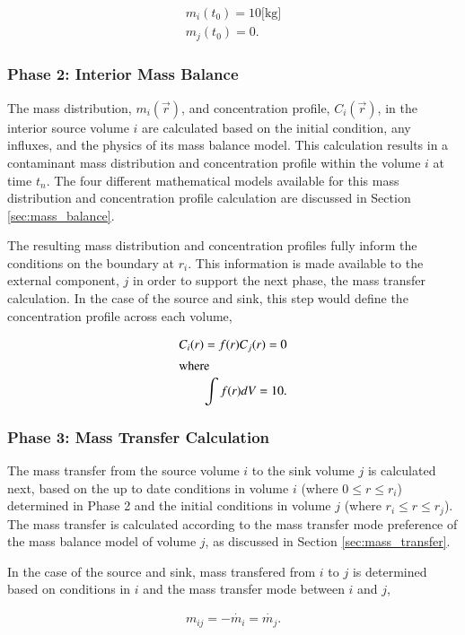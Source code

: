 \begin{align}
 m_i(t_0) = 10 \mbox{[kg]}\\
 m_j(t_0) = 0.
\end{align}

\subsubsection{Phase 2: Interior Mass Balance}

The mass distribution, $m_i(\vec{r})$, and concentration profile, $C_i(\vec{r})$, in the interior source volume
$i$ are calculated based on the initial condition, any influxes, and the physics of
its mass balance model.  This calculation results in a contaminant mass
distribution and concentration profile within the volume $i$ at time $t_n$.
The four different mathematical models available for this mass distribution and
concentration profile calculation are discussed in Section \ref{sec:mass_balance}.

The resulting mass distribution and concentration profiles fully inform
the conditions on the boundary at $r_i$. This information is made available
to the external component, $j$ in order to support the next phase, the mass
transfer calculation. In the case of the source and sink, this step would
define the concentration profile across each volume,

\begin{align}
C_i(r) = f(r)
C_j(r) = 0\\
\intertext{where}
\int f(r)dV = 10.
\end{align}

\subsubsection{Phase 3: Mass Transfer Calculation}

The mass transfer from the source volume $i$ to the sink volume $j$ is
calculated next, based on the up to date conditions in volume $i$ (where $0\le r \le r_i$)
determined in Phase 2 and the initial conditions in volume $j$ (where $r_i \le
r \le r_j$). The mass transfer is calculated according to the mass transfer mode
preference of the mass balance model of volume $j$, as discussed in Section
\ref{sec:mass_transfer}.

In the case of the source and sink, mass transfered from $i$ to $j$ is
determined based on conditions in $i$ and the mass transfer mode between $i$
and $j$,

\begin{align}
m_{ij}= -\dot{m_i} = \dot{m_j}.
\end{align}

